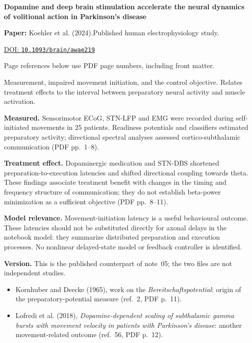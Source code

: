 

{\Large\bfseries Dopamine and deep brain stimulation accelerate the neural dynamics of volitional action in Parkinson's disease\par}

\textbf{Paper:} Koehler et al. (2024).\quad Published human electrophysiology study.\par
\href{https://doi.org/10.1093/brain/awae219}{DOI: \nolinkurl{10.1093/brain/awae219}}\par
{\footnotesize Page references below use PDF page numbers, including front matter.}

Measurement, impaired movement initiation, and the control objective. Relates treatment effects to the interval between preparatory neural activity and muscle activation.

\textbf{Measured.} Sensorimotor ECoG, STN-LFP and EMG were recorded during self-initiated movements in 25 patients. Readiness potentials and classifiers estimated preparatory activity; directional spectral analyses assessed cortico-subthalamic communication (PDF pp.~1--8).

\textbf{Treatment effect.} Dopaminergic medication and STN-DBS shortened preparation-to-execution latencies and shifted directional coupling towards theta. These findings associate treatment benefit with changes in the timing and frequency structure of communication; they do not establish beta-power minimization as a sufficient objective (PDF pp.~8--11).

\textbf{Model relevance.} Movement-initiation latency is a useful behavioural outcome. These latencies should not be substituted directly for axonal delays in the notebook model: they summarize distributed preparation and execution processes. No nonlinear delayed-state model or feedback controller is identified.

\textbf{Version.} This is the published counterpart of note~05; the two files are not independent studies.

\begin{itemize}
\item Kornhuber and Deecke (1965), work on the \emph{Bereitschaftspotential}: origin of the preparatory-potential measure (ref.~2, PDF p.~11).
\item Lofredi et al. (2018), \emph{Dopamine-dependent scaling of subthalamic gamma bursts with movement velocity in patients with Parkinson's disease}: another movement-related outcome (ref.~56, PDF p.~12).
\end{itemize}


